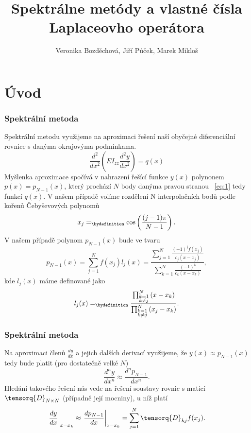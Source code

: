 \documentclass{beamer}
\title[Spektrálne metódy]{Spektrálne metódy a vlastné čísla Laplaceovho operátora}
\author[Veronika Bozděchová, Jiří Púček, Marek Mikloš] {Veronika Bozděchová, Jiří Púček, Marek Mikloš \\ }
\institute[Charles University]{Charles University, Czech Republic}
\date{}
\begin{document}
\begin{frame}
\titlepage

\end{frame}


\section*{Úvod}
\label{sec:1}


	\begin{frame}
 	\frametitle{Spektrální metoda}
		{\tiny Spektrální metodu využijeme na aproximaci řešení naší obyčejné diferenciální rovnice	s danýma okrajovýma podmínkama.
		\begin{equation}
			\label{eq:1}
			\frac{d^2}{dx^2}\left(EI_{zz}\frac{d^2y}{dx^2}\right)=q(x)
		\end{equation}
	Myšlenka aproximace spočívá v nahrazení řešící funkce $y(x)$ polynonem $p(x)=p_{N-1}(x)$, který prochází $N$ body danýma pravou stranou ~\eqref{eq:1} tedy funkcí $q(x)$. V našem případě volíme rozdělení N interpolačních bodů podle kořenů Čebyševových polynomů
	\begin{equation}
		\label{eq:chebyshev-points}
		x_j =_{\bydefinition} \cos \left( \frac{(j-1) \pi}{N-1}  \right).
	\end{equation}
	V našem případě polynom $p_{N-1}(x)$ bude ve tvaru
	\begin{equation}
		\label{eq:rov}
		p_{N-1}(x)
		=\sum_{j=1}^N
		f(x_j)
		l_j(x)=
		\frac{
			\sum_{j=1}^N
			\frac{(-1)^j f(x_j)}{c_j \left(x-x_j\right)}
		}
		{
			\sum_{k=1}^N\frac{(-1)^k}{c_k\left(x-x_k\right)}
		},
	\end{equation}
	kde $l_j(x)$ máme definované jako
		\begin{equation}
		\label{eq:lj}
		l_j(x)
		=_{\bydefinition}
		\frac{\prod_{\substack{k=1 \\ k \not = j}}^N \left(x-x_k\right)}{\prod_{\substack {k=1 \\ k \not = j}}^N \left(x_j-x_k\right)}.
		\end{equation}
	}
\end{frame}
	
	\begin{frame}
		\frametitle{Spektrální metoda}
		Na aproximaci členů $\frac{dy}{dx}$ a jejich dalších derivací využijeme, že $y(x)\approx p_{N-1}(x)$ tedy bude platit (pro dostatečně velké $N$)
			\begin{equation}
				\label{eq:aproxderiv}
				\frac{d^n y}{dx^n}\approx \frac{d^n p_{N-1}}{dx^n}.
			\end{equation}
		Hledání takového řešení nás vede na řešení soustavy rovnic s maticí $\tensorq{D}_{N \times N}$ (případně její mocniny), u níž platí
	\begin{equation}
		\label{eq:14}
		\left.
		\frac{dy}{dx}
		\right|_{x=x_k}
		\approx
		\left.
		\frac{dp_{N-1}}{dx}
		\right|_{x=x_k}
		=
		\sum_{j=1}^N
		\tensorq{D}_{kj}
		f(x_j)
		.
	\end{equation}
\end{frame}
\end{document}
